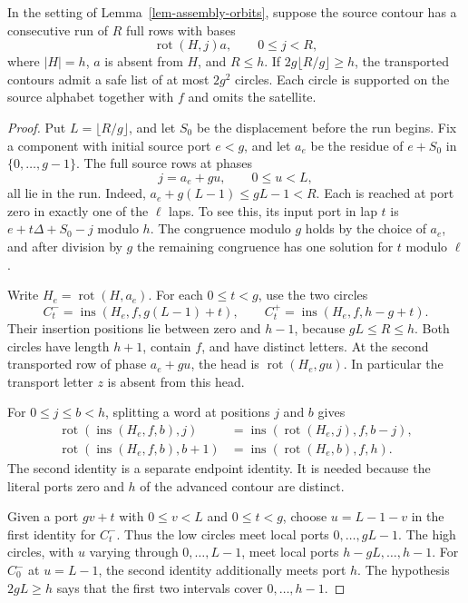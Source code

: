 \begin{lemma}\label{lem-assembly-connectors}
In the setting of Lemma~\ref{lem-assembly-orbits}, suppose the source
contour has a consecutive run of $R$ full rows with bases
\[
 \operatorname{rot}(H,j)a,\qquad 0\le j<R,
\]
where $|H|=h$, $a$ is absent from $H$, and $R\le h$.
If $2g\lfloor R/g\rfloor\ge h$, the transported contours admit a safe
list of at most $2g^2$ circles. Each circle is supported on the source
alphabet together with $f$ and omits the satellite.
\end{lemma}

\begin{proof}
Put $L=\lfloor R/g\rfloor$, and let $S_0$ be the displacement before
the run begins. Fix a component with initial source port $e<g$, and
let $a_e$ be the residue of $e+S_0$ in $\{0,\ldots,g-1\}$.
The full source rows at phases
\[
 j=a_e+gu,\qquad 0\le u<L,
\]
all lie in the run. Indeed, $a_e+g(L-1)\le gL-1<R$.
Each is reached at port zero in exactly one of the $\ell$ laps. To
see this, its input port in lap $t$ is
$e+t\Delta+S_0-j$ modulo $h$. The congruence modulo $g$ holds by the
choice of $a_e$, and after division by $g$ the remaining congruence has
one solution for $t$ modulo $\ell$.

Write $H_e=\operatorname{rot}(H,a_e)$. For each $0\le t<g$, use the
two circles
\[
 C^-_t=\operatorname{ins}(H_e,f,g(L-1)+t),\qquad
 C^+_t=\operatorname{ins}(H_e,f,h-g+t).
\]
Their insertion positions lie between zero and $h-1$, because
$gL\le R\le h$. Both circles have length $h+1$, contain $f$, and
have distinct letters. At the second transported row of phase $a_e+gu$,
the head is $\operatorname{rot}(H_e,gu)$. In particular the transport
letter $z$ is absent from this head.

For $0\le j\le b<h$, splitting a word at positions $j$ and $b$ gives
\begin{align*}
 \operatorname{rot}(\operatorname{ins}(H_e,f,b),j)
   &=\operatorname{ins}(\operatorname{rot}(H_e,j),f,b-j),\\
 \operatorname{rot}(\operatorname{ins}(H_e,f,b),b+1)
   &=\operatorname{ins}(\operatorname{rot}(H_e,b),f,h).
\end{align*}
The second identity is a separate endpoint identity. It is needed because
the literal ports zero and $h$ of the advanced contour are distinct.

Given a port $gv+t$ with $0\le v<L$ and $0\le t<g$, choose
$u=L-1-v$ in the first identity for $C^-_t$. Thus the low circles meet
local ports $0,\ldots,gL-1$. The high circles, with $u$ varying through
$0,\ldots,L-1$, meet local ports $h-gL,\ldots,h-1$. For $C^-_0$ at
$u=L-1$, the second identity additionally meets port $h$.
The hypothesis $2gL\ge h$ says that the first two intervals cover
$0,\ldots,h-1$.


\end{proof}
